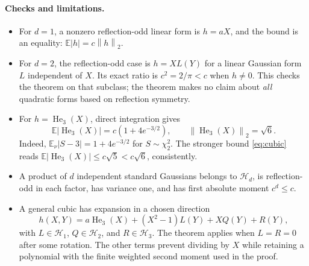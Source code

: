\documentclass[11pt]{article}
\newcommand{\E}{\mathbb E}
\newcommand{\Hh}{\mathcal H}
\newcommand{\He}{\operatorname{He}}
\newcommand{\norm}[1]{\left\lVert #1\right\rVert}
\begin{document}
\paragraph{Checks and limitations.}
\begin{itemize}
\item For $d=1$, a nonzero reflection-odd linear form is $h=aX$, and the
bound is an equality: $\E|h|=c\norm{h}_2$.
\item For $d=2$, the reflection-odd case is $h=XL(Y)$ for a linear Gaussian
form $L$ independent of $X$.  Its exact ratio is $c^2=2/\pi<c$ when
$h\ne0$.  This checks the theorem on that subclass; the theorem makes no
claim about \emph{all} quadratic forms based on reflection symmetry.
\item For $h=\He_3(X)$, direct integration gives
\[
 \E|\He_3(X)|=c(1+4e^{-3/2}),\qquad
 \norm{\He_3(X)}_2=\sqrt6.
\]
Indeed, $\E_\nu|S-3|=1+4e^{-3/2}$ for $S\sim\chi^2_2$.
The stronger bound \eqref{eq:cubic} reads
$\E|\He_3(X)|\leq c\sqrt5<c\sqrt6$, consistently.
\item A product of $d$ independent standard Gaussians belongs to $\Hh_d$,
is reflection-odd in each factor, has variance one, and has first absolute
moment $c^d\leq c$.
\item A general cubic has expansion in a chosen direction
\[
 h(X,Y)=a\He_3(X)+(X^2-1)L(Y)+XQ(Y)+R(Y),
\]
with $L\in\Hh_1$, $Q\in\Hh_2$, and $R\in\Hh_3$.
The theorem applies when $L=R=0$ after some rotation.  The other terms
prevent dividing by $X$ while retaining a polynomial with the finite
weighted second moment used in the proof.
\end{itemize}
\end{document}
